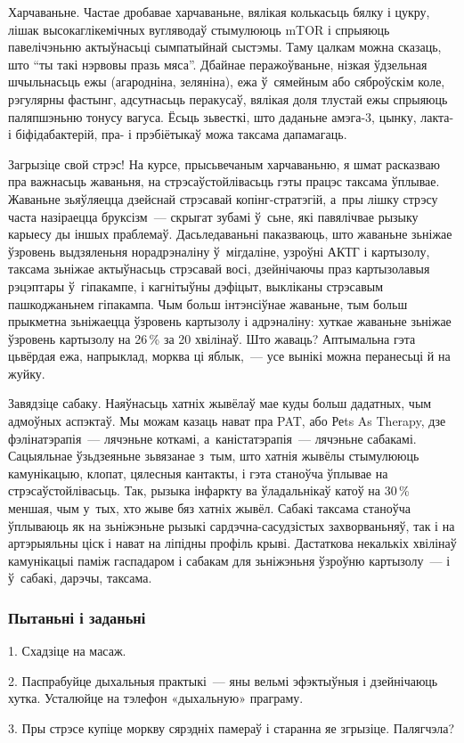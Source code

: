 Харчаваньне. Частае дробавае харчаваньне, вялікая колькасьць бялку і цукру, лішак высокаглікемічных вугляводаў стымулююць mTOR і спрыяюць павелічэньню актыўнасьці сымпатыйнай сыстэмы. Таму цалкам можна сказаць, што ``ты такі нэрвовы празь мяса''. Дбайнае перажоўваньне, нізкая ўдзельная шчыльнасьць ежы (агародніна, зеляніна), ежа ў~сямейным або сяброўскім коле, рэгулярны фастынг, адсутнасьць перакусаў, вялікая доля тлустай ежы спрыяюць паляпшэньню тонусу вагуса. Ёсьць зьвесткі, што даданьне амэга-3, цынку, лакта- і біфідабактерій, пра- і прэбіётыкаў можа таксама дапамагаць.

Загрызіце свой стрэс! На курсе, прысьвечаным харчаваньню, я шмат расказваю пра важнасьць жаваньня, на стрэсаўстойлівасьць гэты працэс таксама ўплывае. Жаваньне зьяўляецца дзейснай стрэсавай копінг-стратэгій, а~пры лішку стрэсу часта назіраецца бруксізм~--- скрыгат зубамі ў~сьне, які павялічвае рызыку карыесу ды іншых праблемаў. Дасьледаваньні паказваюць, што жаваньне зьніжае ўзровень выдзяленьня норадрэналіну ў~мігдаліне, узроўні АКТГ і картызолу, таксама зьніжае актыўнасьць стрэсавай восі, дзейнічаючы праз картызолавыя рэцэптары ў~гіпакампе, і кагнітыўны дэфіцыт, выкліканы стрэсавым пашкоджаньнем гіпакампа. Чым больш інтэнсіўнае жаваньне, тым больш прыкметна зьніжаецца ўзровень картызолу і адрэналіну: хуткае жаваньне зьніжае ўзровень картызолу на 26\,\% за 20 хвілінаў. Што жаваць? Аптымальна гэта цьвёрдая ежа, напрыклад, морква ці яблык,~--- усе вынікі можна перанесьці й на жуйку.

Завядзіце сабаку. Наяўнасьць хатніх жывёлаў мае куды больш дадатных, чым адмоўных аспэктаў. Мы можам казаць нават пра PAT, або Реts As Therapy, дзе фэлінатэрапія~--- лячэньне коткамі, а~каністатэрапія~--- лячэньне сабакамі. Сацыяльнае ўзьдзеяньне зьвязанае з~тым, што хатнія жывёлы стымулююць камунікацыю, клопат, цялесныя кантакты, і гэта станоўча ўплывае на стрэсаўстойлівасьць. Так, рызыка інфаркту ва ўладальнікаў катоў на 30\,\% меншая, чым у~тых, хто жыве бяз хатніх жывёл. Сабакі таксама станоўча ўплываюць як на зьніжэньне рызыкі сардэчна-сасудзістых захворваньняў, так і на артэрыяльны ціск і нават на ліпідны профіль крыві. Дастаткова некалькіх хвілінаў камунікацыі паміж гаспадаром і сабакам для зьніжэньня ўзроўню картызолу~--- і ў~сабакі, дарэчы, таксама.

\subsubsection{Пытаньні і заданьні}

1. Схадзіце на масаж.

2. Паспрабуйце дыхальныя практыкі~--- яны вельмі эфэктыўныя і дзейнічаюць хутка. Усталюйце на тэлефон «дыхальную» праграму.

3. Пры стрэсе купіце моркву сярэдніх памераў і старанна яе згрызіце. Палягчэла?

